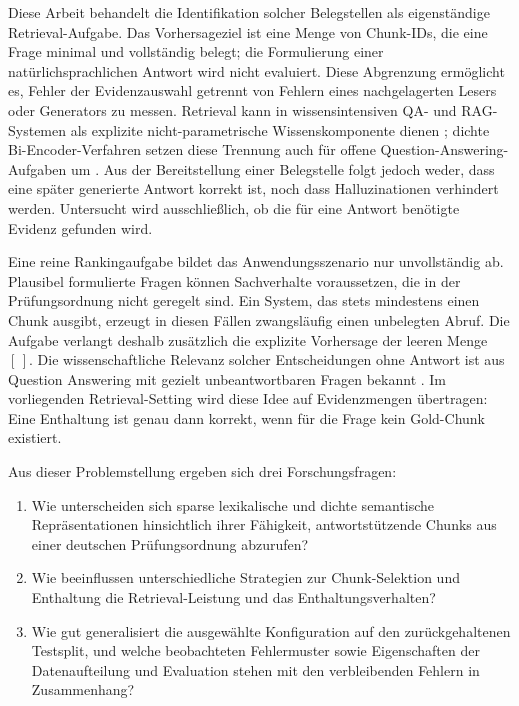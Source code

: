 \documentclass[11pt]{article}
\begin{document}
Diese Arbeit behandelt die Identifikation solcher Belegstellen als eigenständige Retrieval-Aufgabe. Das Vorhersageziel ist eine Menge von Chunk-IDs, die eine Frage minimal und vollständig belegt; die Formulierung einer natürlichsprachlichen Antwort wird nicht evaluiert. Diese Abgrenzung ermöglicht es, Fehler der Evidenzauswahl getrennt von Fehlern eines nachgelagerten Lesers oder Generators zu messen. Retrieval kann in wissensintensiven QA- und RAG-Systemen als explizite nicht-parametrische Wissenskomponente dienen \citep{lewis2020rag}; dichte Bi-Encoder-Verfahren setzen diese Trennung auch für offene Question-Answering-Aufgaben um \citep{karpukhin-etal-2020-dense}. Aus der Bereitstellung einer Belegstelle folgt jedoch weder, dass eine später generierte Antwort korrekt ist, noch dass Halluzinationen verhindert werden. Untersucht wird ausschließlich, ob die für eine Antwort benötigte Evidenz gefunden wird.

Eine reine Rankingaufgabe bildet das Anwendungsszenario nur unvollständig ab. Plausibel formulierte Fragen können Sachverhalte voraussetzen, die in der Prüfungsordnung nicht geregelt sind. Ein System, das stets mindestens einen Chunk ausgibt, erzeugt in diesen Fällen zwangsläufig einen unbelegten Abruf. Die Aufgabe verlangt deshalb zusätzlich die explizite Vorhersage der leeren Menge $[\,]$. Die wissenschaftliche Relevanz solcher Entscheidungen ohne Antwort ist aus Question Answering mit gezielt unbeantwortbaren Fragen bekannt \citep{rajpurkar-etal-2018-know}. Im vorliegenden Retrieval-Setting wird diese Idee auf Evidenzmengen übertragen: Eine Enthaltung ist genau dann korrekt, wenn für die Frage kein Gold-Chunk existiert.

Aus dieser Problemstellung ergeben sich drei Forschungsfragen:

\begin{enumerate}
    \item[\textbf{RQ1}] Wie unterscheiden sich sparse lexikalische und dichte semantische Repräsentationen hinsichtlich ihrer Fähigkeit, antwortstützende Chunks aus einer deutschen Prüfungsordnung abzurufen?
    \item[\textbf{RQ2}] Wie beeinflussen unterschiedliche Strategien zur Chunk-Selektion und Enthaltung die Retrieval-Leistung und das Enthaltungsverhalten?
    \item[\textbf{RQ3}] Wie gut generalisiert die ausgewählte Konfiguration auf den zurückgehaltenen Testsplit, und welche beobachteten Fehlermuster sowie Eigenschaften der Datenaufteilung und Evaluation stehen mit den verbleibenden Fehlern in Zusammenhang?
\end{enumerate}
\end{document}
